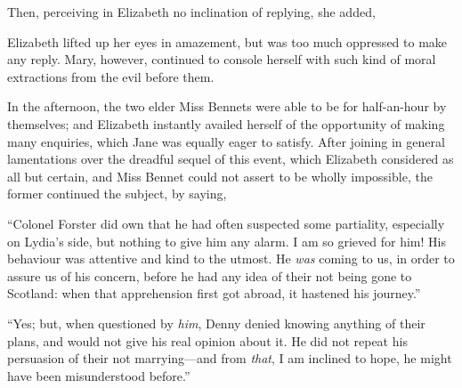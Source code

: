 
Then, perceiving in Elizabeth no inclination of replying, she added, 

Elizabeth lifted up her eyes in amazement, but was too much oppressed to make any reply. Mary, however, continued to console herself with such kind of moral extractions from the evil before them.

In the afternoon, the two elder Miss Bennets were able to be for half-an-hour by themselves; and Elizabeth instantly availed herself of the opportunity of making many enquiries, which Jane was equally eager to satisfy. After joining in general lamentations over the dreadful sequel of this event, which Elizabeth considered as all but certain, and Miss Bennet could not assert to be wholly impossible, the former continued the subject, by saying, 

“Colonel Forster did own that he had often suspected some partiality, especially on Lydia's side, but nothing to give him any alarm. I am so grieved for him! His behaviour was attentive and kind to the utmost. He {\em was} coming to us, in order to assure us of his concern, before he had any idea of their not being gone to Scotland: when that apprehension first got abroad, it hastened his journey.”


“Yes; but, when questioned by {\em him}, Denny denied knowing anything of their plans, and would not give his real opinion about it. He did not repeat his persuasion of their not marrying---and from {\em that}, I am inclined to hope, he might have been misunderstood before.”

